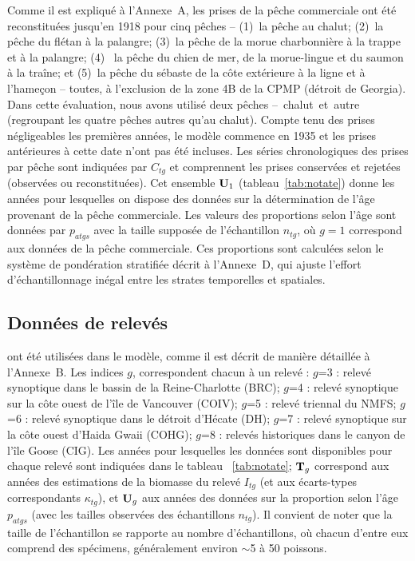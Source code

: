 \documentclass[11pt]{book}
\newcommand{\angL}{\guillemotleft\,}
\newcommand{\angR}{\,\guillemotright}
\newcommand{\AppCat}{Annexe~A}
\newcommand{\AppSurv}{Annexe~B}
\newcommand{\AppBio}{Annexe~D}
\begin{document}
Comme il est expliqu\'{e} \`{a} l'\AppCat, les prises de la p\^{e}che commerciale ont \'{e}t\'{e} reconstitu\'{e}es jusqu'en 1918 pour cinq p\^{e}ches -- (1)~la p\^{e}che au chalut; (2)~la p\^{e}che du fl\'{e}tan \`{a} la palangre; (3)~la p\^{e}che de la morue charbonni\`{e}re \`{a} la trappe et \`{a} la palangre; (4)~ la p\^{e}che du chien de mer, de la morue-lingue et du saumon \`{a} la tra\^{i}ne; et (5)~la p\^{e}che du s\'{e}baste de la c\^{o}te ext\'{e}rieure \`{a} la ligne et \`{a} l'hame\c{c}on -- toutes, \`{a} l'exclusion de la zone 4B de la CPMP (d\'{e}troit de Georgia).
Dans cette \'{e}valuation, nous avons utilis\'{e} deux p\^{e}ches -- \angL{}chalut\angR{} et \angL{}autre\angR{} (regroupant les quatre p\^{e}ches autres qu'au chalut).
Compte tenu des prises n\'{e}gligeables les premi\`{e}res ann\'{e}es, le mod\`{e}le commence en 1935 et les prises ant\'{e}rieures \`{a} cette date n'ont pas \'{e}t\'{e} incluses.
Les s\'{e}ries chronologiques des prises par p\^{e}che sont indiqu\'{e}es par $C_{tg}$ et comprennent les prises conserv\'{e}es et rejet\'{e}es (observ\'{e}es ou reconstitu\'{e}es). 
Cet ensemble ${\bf U}_{1}$ (tableau~\ref{tab:notate}) donne les ann\'{e}es pour lesquelles on dispose des donn\'{e}es sur la d\'{e}termination de l'\^{a}ge provenant de la p\^{e}che commerciale.
Les valeurs des proportions selon l'\^{a}ge sont donn\'{e}es par $p_{atgs}$ avec la taille suppos\'{e}e de l'\'{e}chantillon $n_{tg}$, o\`{u} $g=1$ correspond aux donn\'{e}es de la p\^{e}che commerciale.
Ces proportions sont calcul\'{e}es selon le syst\`{e}me de pond\'{e}ration stratifi\'{e}e d\'{e}crit \`{a} l'\AppBio, qui ajuste l'effort d'\'{e}chantillonnage in\'{e}gal entre les strates temporelles et spatiales.

\subsection{Donn\'{e}es de relev\'{e}s} 
ont \'{e}t\'{e} utilis\'{e}es dans le mod\`{e}le, comme il est d\'{e}crit de mani\`{e}re d\'{e}taill\'{e}e \`{a} l'\AppSurv{}.
Les indices $g$, correspondent chacun \`{a} un relev\'{e} :  $g$=3 : relev\'{e} synoptique dans le bassin de la Reine-Charlotte (BRC);  $g$=4 : relev\'{e} synoptique sur la c\^{o}te ouest de l'\^{i}le de Vancouver (COIV);  $g$=5 : relev\'{e} triennal du NMFS;  $g$=6 : relev\'{e} synoptique dans le d\'{e}troit d'H\'{e}cate (DH);  $g$=7 : relev\'{e} synoptique sur la c\^{o}te ouest d'Haida Gwaii (COHG);  $g$=8 : relev\'{e}s historiques dans le canyon de l'\^{i}le Goose (CIG).
Les ann\'{e}es pour lesquelles les donn\'{e}es sont disponibles pour chaque relev\'{e} sont indiqu\'{e}es dans le tableau ~\ref{tab:notate};
${\bf T}_g$ correspond aux ann\'{e}es des estimations de la biomasse du relev\'{e} $I_{tg}$ (et aux \'{e}carts-types correspondants $\kappa_{tg}$), et ${\bf U}_g$ aux ann\'{e}es des donn\'{e}es sur la proportion selon l'\^{a}ge $p_{atgs}$ (avec les tailles observ\'{e}es des \'{e}chantillons $n_{tg}$).
Il convient de noter que la taille de l'\'{e}chantillon se rapporte au nombre d'\'{e}chantillons, o\`{u} chacun d'entre eux comprend des sp\'{e}cimens, g\'{e}n\'{e}ralement environ $\sim$5 \`{a} 50 poissons.
\end{document}
